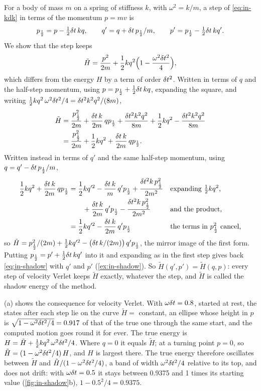 For a body of mass $m$ on a spring of stiffness $k$, with $\omega^2 =
k/m$, a step of \cref{eq:in-kdk} in terms of the momentum $p = mv$ is
\begin{equation*}
   p_{\frac12} = p - \tfrac12\delta t\,kq , \qquad
   q' = q + \delta t\,p_{\frac12}/m , \qquad
   p' = p_{\frac12} - \tfrac12\delta t\,kq' .
\end{equation*}
We show that the step keeps
\begin{equation}
   \tilde{H} = \frac{p^2}{2m} + \frac12 kq^2\Bigl(1 - \frac{\omega^2\delta t^2}
   {4}\Bigr) ,
   \label{eq:in-shadow}
\end{equation}
which differs from the energy $H$ by a term of order $\delta t^2$. Written in
terms of $q$ and the half-step momentum, using $p = p_{\frac12} + \frac12\delta t
\,kq$, expanding the square, and writing $\frac12 kq^2\,\omega^2\delta t^2/4 =
\delta t^2k^2q^2/(8m)$,
\begin{align*}
   \tilde{H} &= \frac{p_{\frac12}^2}{2m} + \frac{\delta t\,k}{2m}\,qp_{\frac12}
   + \frac{\delta t^2k^2q^2}{8m} + \frac12 kq^2 - \frac{\delta t^2k^2q^2}{8m}\\
   &= \frac{p_{\frac12}^2}{2m} + \frac12 kq^2 + \frac{\delta t\,k}{2m}\,
   qp_{\frac12} .
\end{align*}
Written instead in terms of $q'$ and the same half-step momentum, using $q
= q' - \delta t\,p_{\frac12}/m$,
\begin{align*}
   \frac12 kq^2 + \frac{\delta t\,k}{2m}\,qp_{\frac12}
   &= \frac12 kq'^2 - \frac{\delta t\,k}{m}\,q'p_{\frac12}
   + \frac{\delta t^2k\,p_{\frac12}^2}{2m^2}
   && \text{expanding $\tfrac12 kq^2$,}\\
   &\qquad + \frac{\delta t\,k}{2m}\,q'p_{\frac12}
   - \frac{\delta t^2k\,p_{\frac12}^2}{2m^2}
   && \text{and the product,}\\
   &= \frac12 kq'^2 - \frac{\delta t\,k}{2m}\,q'p_{\frac12}
   && \text{the terms in $p_{\frac12}^2$ cancel,}
\end{align*}
so $\tilde{H} = p_{\frac12}^2/(2m) + \frac12 kq'^2 - \bigl(\delta t\,k/(2m)
\bigr)\,q'p_{\frac12}$, the mirror image of the first form. Putting $p_{\frac12} =
p' + \frac12\delta t\,kq'$ into it and expanding as in the first step gives
back \cref{eq:in-shadow} with $q'$ and $p'$ (\cref{ex:in-shadow}). So
$\tilde{H}(q', p') = \tilde{H}(q, p)$: every step of velocity Verlet keeps
$\tilde{H}$ exactly, whatever the step, and $\tilde{H}$ is called the
shadow energy of the method.

(a) shows the consequence for velocity Verlet. With
$\omega\delta t = 0.8$, started at rest, the states after each step lie on the
curve $\tilde{H} = $ constant, an ellipse whose height in $p$ is $\sqrt{1
- \omega^2\delta t^2/4} = 0.917$ of that of the true one through the same
start, and the computed motion goes round it for ever. The true energy is
$H = \tilde{H} + \frac12 kq^2\,\omega^2\delta t^2/4$. Where $q = 0$ it equals
$\tilde{H}$; at a turning point $p = 0$, so $\tilde{H} = (1 -
\omega^2\delta t^2/4)\,H$, and $H$ is largest there. The true energy therefore
oscillates between $\tilde{H}$ and $\tilde{H}/(1 - \omega^2\delta t^2/4)$, a
band of width $\omega^2\delta t^2/4$ relative to its top, and does not drift:
with $\omega\delta t = 0.5$ it stays between 0.9375 and 1 times its starting
value (\cref{fig:in-shadow}b), $1 - 0.5^2/4 = 0.9375$.

